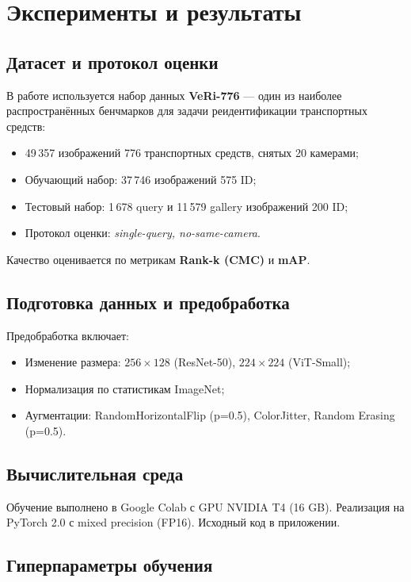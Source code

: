 ﻿{\huge\chapter{Эксперименты и результаты}}
\label{sec:Chapter3} 

\section{Датасет и протокол оценки}
В работе используется набор данных \textbf{VeRi-776} — один из наиболее распространённых бенчмарков для задачи реидентификации транспортных средств:
\begin{itemize}
  \item 49\,357 изображений 776 транспортных средств, снятых 20 камерами;
  \item Обучающий набор: 37\,746 изображений 575 ID;
  \item Тестовый набор: 1\,678 query и 11\,579 gallery изображений 200 ID;
  \item Протокол оценки: \emph{single-query, no-same-camera}.
\end{itemize}
Качество оценивается по метрикам \textbf{Rank-k (CMC)} и \textbf{mAP}.

\section{Подготовка данных и предобработка}
Предобработка включает:
\begin{itemize}
  \item Изменение размера: $256\times128$ (ResNet-50), $224\times224$ (ViT-Small);
  \item Нормализация по статистикам ImageNet;
  \item Аугментации: RandomHorizontalFlip (p=0.5), ColorJitter, Random Erasing (p=0.5).
\end{itemize}

\section{Вычислительная среда}
Обучение выполнено в Google Colab с GPU NVIDIA T4 (16 GB). Реализация на PyTorch 2.0 с mixed precision (FP16). Исходный код в приложении.

\section{Гиперпараметры обучения}

